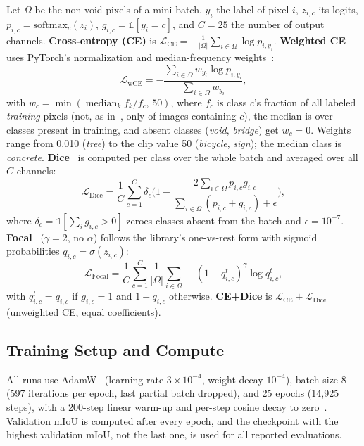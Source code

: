 Let $\Omega$ be the non-void pixels of a mini-batch, $y_i$ the label of pixel
$i$, $z_{i,c}$ its logits, $p_{i,c}=\mathrm{softmax}_c(z_i)$,
$g_{i,c}=\mathbb{1}[y_i=c]$, and $C=25$ the number of output channels.
\textbf{Cross-entropy (CE)} is
$\mathcal{L}_\mathrm{CE}=-\frac{1}{|\Omega|}\sum_{i\in\Omega}\log p_{i,y_i}$.
\textbf{Weighted CE} uses PyTorch's normalization and median-frequency
weights~\cite{eigen2015predicting}:
\begin{equation}
  \mathcal{L}_\mathrm{wCE} =
  -\frac{\sum_{i\in\Omega} w_{y_i}\log p_{i,y_i}}{\sum_{i\in\Omega} w_{y_i}},
  \label{eq:wce}
\end{equation}
with $w_c=\min(\operatorname{median}_k f_k/f_c,\,50)$, where $f_c$ is class $c$'s fraction of all labeled \emph{training} pixels (not,
as in~\cite{eigen2015predicting}, only of images containing $c$), the median is
over classes present in training, and absent classes (\emph{void},
\emph{bridge}) get $w_c=0$. Weights range from 0.010 (\emph{tree}) to the clip
value 50 (\emph{bicycle}, \emph{sign}); the median class is \emph{concrete}.
\textbf{Dice}~\cite{milletari2016vnet} is computed per class over the whole
batch and averaged over all $C$ channels:
\begin{equation}
  \mathcal{L}_\mathrm{Dice} = \frac{1}{C}\sum_{c=1}^{C} \delta_c
  \Big(1-\frac{2\sum_{i\in\Omega}p_{i,c}g_{i,c}}
  {\sum_{i\in\Omega}(p_{i,c}+g_{i,c})+\epsilon}\Big),
\end{equation}
where $\delta_c=\mathbb{1}[\sum_i g_{i,c}>0]$ zeroes classes absent from the
batch and $\epsilon=10^{-7}$. \textbf{Focal}~\cite{lin2017focal} ($\gamma=2$,
no $\alpha$) follows the library's one-vs-rest form with sigmoid probabilities
$q_{i,c}=\sigma(z_{i,c})$:
\begin{equation}
  \mathcal{L}_\mathrm{Focal} = \frac{1}{C}\sum_{c=1}^{C}\frac{1}{|\Omega|}
  \sum_{i\in\Omega} -(1-q^{t}_{i,c})^{\gamma}\log q^{t}_{i,c},
\end{equation}
with $q^{t}_{i,c}=q_{i,c}$ if $g_{i,c}=1$ and $1-q_{i,c}$ otherwise.
\textbf{CE+Dice} is $\mathcal{L}_\mathrm{CE}+\mathcal{L}_\mathrm{Dice}$
(unweighted CE, equal coefficients).

\subsection{Training Setup and Compute}
\label{sec:compute}

All runs use AdamW~\cite{loshchilov2019adamw} (learning rate $3\times10^{-4}$,
weight decay $10^{-4}$), batch size 8 (597 iterations per epoch, last partial
batch dropped), and 25 epochs (14,925 steps), with a 200-step linear warm-up and
per-step cosine decay to zero~\cite{loshchilov2017sgdr}. Validation mIoU is
computed after every epoch, and the checkpoint with the highest validation mIoU,
not the last one, is used for all reported evaluations.

